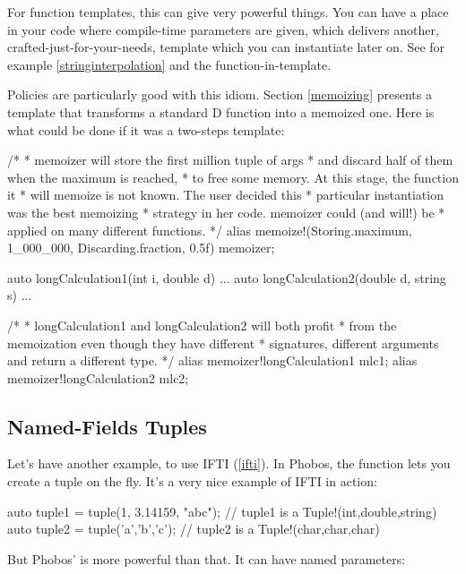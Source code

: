 For function templates, this can give very powerful things. You can have a place in your code where compile-time parameters are given, which delivers another, crafted-just-for-your-needs, template which you can instantiate later on. See for example \ref{stringinterpolation} and the  function-in-template.

Policies are particularly good with this idiom. Section \ref{memoizing} presents a template that transforms a standard D function into a memoized one. Here is what could be done if it was a two-steps template:

\begin{dcode}
/*
 * memoizer will store the first million tuple of args
 * and discard half of them when the maximum is reached, 
 * to free some memory. At this stage, the function it 
 * will memoize is not known. The user decided this
 * particular instantiation was the best memoizing 
 * strategy in her code. memoizer could (and will!) be 
 * applied on many different functions.
 */
alias memoize!(Storing.maximum, 1_000_000, Discarding.fraction, 0.5f) memoizer;

auto longCalculation1(int i, double d) { ... }
auto longCalculation2(double d, string s) { ... }

/*
 * longCalculation1 and longCalculation2 will both profit 
 * from the memoization even though they have different 
 * signatures, different arguments and return a different type.
 */
alias memoizer!longCalculation1 mlc1;
alias memoizer!longCalculation2 mlc2;
\end{dcode}


\subsection{Named-Fields Tuples}

Let's have another example, to use IFTI (\ref{ifti}). In Phobos, the function  lets you create a tuple on the fly. It's a very nice example of IFTI in action:

\begin{dcode}
auto tuple1 = tuple(1, 3.14159, "abc"); // tuple1 is a Tuple!(int,double,string)
auto tuple2 = tuple('a','b','c'); // tuple2 is a Tuple!(char,char,char)
\end{dcode}

But Phobos'  is more powerful than that. It can have named parameters:

